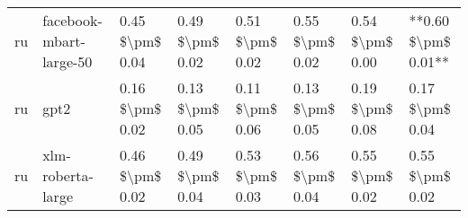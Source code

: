 \begin{tabular}{llllllll}
      ru &            facebook-mbart-large-50 & 0.45 \$\textbackslash pm\$ 0.04 &           0.49 \$\textbackslash pm\$ 0.02 &       0.51 \$\textbackslash pm\$ 0.02 &        0.55 \$\textbackslash pm\$ 0.02 &                         0.54 \$\textbackslash pm\$ 0.00 & **0.60 \$\textbackslash pm\$ 0.01** \\
      ru &                               gpt2 & 0.16 \$\textbackslash pm\$ 0.02 &           0.13 \$\textbackslash pm\$ 0.05 &       0.11 \$\textbackslash pm\$ 0.06 &        0.13 \$\textbackslash pm\$ 0.05 &                         0.19 \$\textbackslash pm\$ 0.08 &     0.17 \$\textbackslash pm\$ 0.04 \\
      ru &                  xlm-roberta-large & 0.46 \$\textbackslash pm\$ 0.02 &           0.49 \$\textbackslash pm\$ 0.04 &       0.53 \$\textbackslash pm\$ 0.03 &        0.56 \$\textbackslash pm\$ 0.04 &                         0.55 \$\textbackslash pm\$ 0.02 &     0.55 \$\textbackslash pm\$ 0.02 \\
\bottomrule
\end{tabular}

